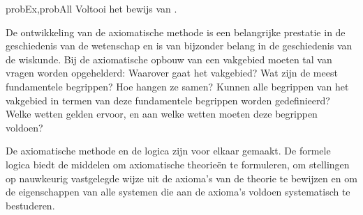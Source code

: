 \documentclass[openany]{memoir}
\begin{document}
\begin{probtag}{probEx,probAll}
  Voltooi het bewijs van .
\end{probtag} 
\endgroup
\OLEndChapterHook

\begingroup
\def\olfilename{OLP-0167}
\def\olfilepath{content/first-order-logic/models-theories/}
\hypertarget{unit-OLP-0167}{}



\endgroup

\begingroup
\def\olfilename{OLP-0168}
\def\olfilepath{content/first-order-logic/models-theories/}
\hypertarget{unit-OLP-0168}{}




\begin{explain}
De ontwikkeling van de axiomatische methode is een belangrijke
prestatie in de geschiedenis van de wetenschap en is van bijzonder
belang in de geschiedenis van de wiskunde. Bij de axiomatische opbouw
van een vakgebied moeten tal van vragen worden opgehelderd: Waarover
gaat het vakgebied? Wat zijn de meest fundamentele begrippen? Hoe
hangen ze samen? Kunnen alle begrippen van het vakgebied in termen van
deze fundamentele begrippen worden gedefinieerd? Welke wetten gelden
ervoor, en aan welke wetten moeten deze begrippen voldoen?

De axiomatische methode en de logica zijn voor elkaar gemaakt. De
formele logica biedt de middelen om axiomatische theorieën te
formuleren, om stellingen op nauwkeurig vastgelegde wijze uit de
axioma's van de theorie te bewijzen en om de eigenschappen van alle
systemen die aan de axioma's voldoen systematisch te bestuderen.
\end{explain}
\end{document}
